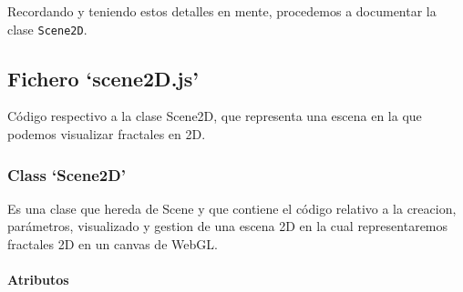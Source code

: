 Recordando y teniendo estos detalles en mente, procedemos a documentar la clase \verb|Scene2D|.

\subsection{Fichero `scene2D.js'}

Código respectivo a la clase Scene2D, que representa una escena en la que podemos visualizar fractales en 2D.

\subsubsection{Class `Scene2D'}

Es una clase que hereda de Scene y que contiene el código relativo a la creacion, parámetros, visualizado y gestion de una escena 2D en la cual representaremos fractales 2D en un canvas de WebGL.

\paragraph*{Atributos}

